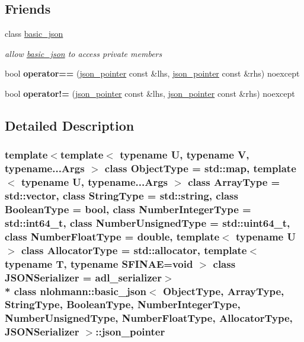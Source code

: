 \subsection*{Friends}
\begin{DoxyCompactItemize}
\item 
class \hyperlink{classnlohmann_1_1basic__json_1_1json__pointer_ada3100cdb8700566051828f1355fa745}{basic\+\_\+json}\hypertarget{classnlohmann_1_1basic__json_1_1json__pointer_ada3100cdb8700566051828f1355fa745}{}\label{classnlohmann_1_1basic__json_1_1json__pointer_ada3100cdb8700566051828f1355fa745}

\begin{DoxyCompactList}\small\item\em allow \hyperlink{classnlohmann_1_1basic__json}{basic\+\_\+json} to access private members \end{DoxyCompactList}\item 
bool {\bfseries operator==} (\hyperlink{classnlohmann_1_1basic__json_1_1json__pointer}{json\+\_\+pointer} const \&lhs, \hyperlink{classnlohmann_1_1basic__json_1_1json__pointer}{json\+\_\+pointer} const \&rhs) noexcept\hypertarget{classnlohmann_1_1basic__json_1_1json__pointer_a4667ef558c8c3f8a646bfda0c6654653}{}\label{classnlohmann_1_1basic__json_1_1json__pointer_a4667ef558c8c3f8a646bfda0c6654653}

\item 
bool {\bfseries operator!=} (\hyperlink{classnlohmann_1_1basic__json_1_1json__pointer}{json\+\_\+pointer} const \&lhs, \hyperlink{classnlohmann_1_1basic__json_1_1json__pointer}{json\+\_\+pointer} const \&rhs) noexcept\hypertarget{classnlohmann_1_1basic__json_1_1json__pointer_a6779edcf28e6f018a3bbb29c0b4b5e1e}{}\label{classnlohmann_1_1basic__json_1_1json__pointer_a6779edcf28e6f018a3bbb29c0b4b5e1e}

\end{DoxyCompactItemize}


\subsection{Detailed Description}
\subsubsection*{template$<$template$<$ typename U, typename V, typename...\+Args $>$ class Object\+Type = std\+::map, template$<$ typename U, typename...\+Args $>$ class Array\+Type = std\+::vector, class String\+Type = std\+::string, class Boolean\+Type = bool, class Number\+Integer\+Type = std\+::int64\+\_\+t, class Number\+Unsigned\+Type = std\+::uint64\+\_\+t, class Number\+Float\+Type = double, template$<$ typename U $>$ class Allocator\+Type = std\+::allocator, template$<$ typename T, typename S\+F\+I\+N\+A\+E=void $>$ class J\+S\+O\+N\+Serializer = adl\+\_\+serializer$>$\\*
class nlohmann\+::basic\+\_\+json$<$ Object\+Type, Array\+Type, String\+Type, Boolean\+Type, Number\+Integer\+Type, Number\+Unsigned\+Type, Number\+Float\+Type, Allocator\+Type, J\+S\+O\+N\+Serializer $>$\+::json\+\_\+pointer}

